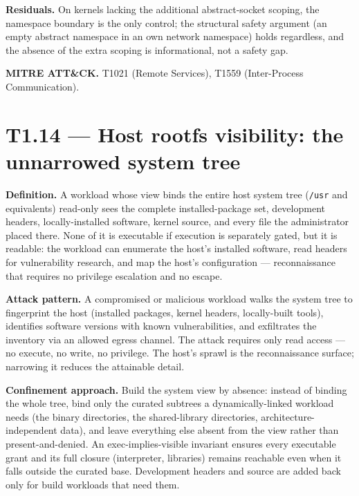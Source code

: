 \textbf{Residuals.} On kernels lacking the additional abstract-socket
scoping, the namespace boundary is the only control; the structural
safety argument (an empty abstract namespace in an own network
namespace) holds regardless, and the absence of the extra scoping is
informational, not a safety gap.

\textbf{MITRE ATT\&CK.} T1021 (Remote Services), T1559 (Inter-Process
Communication).

\hypertarget{t1.14-host-rootfs-visibility-the-unnarrowed-system-tree}{%
\section{T1.14 --- Host rootfs visibility: the unnarrowed system
tree}\label{t1.14-host-rootfs-visibility-the-unnarrowed-system-tree}}

\textbf{Definition.} A workload whose view binds the entire host system
tree (\texttt{/usr} and equivalents) read-only sees the complete
installed-package set, development headers, locally-installed software,
kernel source, and every file the administrator placed there. None of it
is executable if execution is separately gated, but it is readable: the
workload can enumerate the host's installed software, read headers for
vulnerability research, and map the host's configuration ---
reconnaissance that requires no privilege escalation and no escape.

\textbf{Attack pattern.} A compromised or malicious workload walks the
system tree to fingerprint the host (installed packages, kernel headers,
locally-built tools), identifies software versions with known
vulnerabilities, and exfiltrates the inventory via an allowed egress
channel. The attack requires only read access --- no execute, no write,
no privilege. The host's sprawl is the reconnaissance surface; narrowing
it reduces the attainable detail.

\textbf{Confinement approach.} Build the system view by absence: instead
of binding the whole tree, bind only the curated subtrees a
dynamically-linked workload needs (the binary directories, the
shared-library directories, architecture-independent data), and leave
everything else absent from the view rather than present-and-denied. An
exec-implies-visible invariant ensures every executable grant and its
full closure (interpreter, libraries) remains reachable even when it
falls outside the curated base. Development headers and source are added
back only for build workloads that need them.

